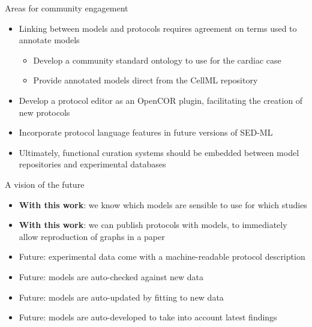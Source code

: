 \documentclass[t,xcolor={usenames,dvipsnames}]{beamer}
\begin{document}
\begin{frame}{Areas for community engagement}
\begin{itemize}
\item Linking between models and protocols requires agreement on terms used to annotate models
  \begin{itemize}
  \item Develop a community standard ontology to use for the cardiac case
  \item Provide annotated models direct from the CellML repository
  \end{itemize}
\item Develop a protocol editor as an OpenCOR plugin, facilitating the creation of new protocols
\item Incorporate protocol language features in future versions of SED-ML
\item Ultimately, functional curation systems should be embedded between model repositories and experimental databases
\end{itemize}
\end{frame}


\begin{frame}{A vision of the future}
\begin{itemize}
\item \textbf{With this work}: we know which models are sensible to use for which studies
\item \textbf{With this work}: we can publish protocols with models, to immediately allow reproduction of graphs in a paper
\item Future: experimental data come with a machine-readable protocol description
\item Future: models are auto-checked against new data
\item Future: models are auto-updated by fitting to new data
\item Future: models are auto-developed to take into account latest findings
\end{itemize}
\end{frame}
\end{document}
